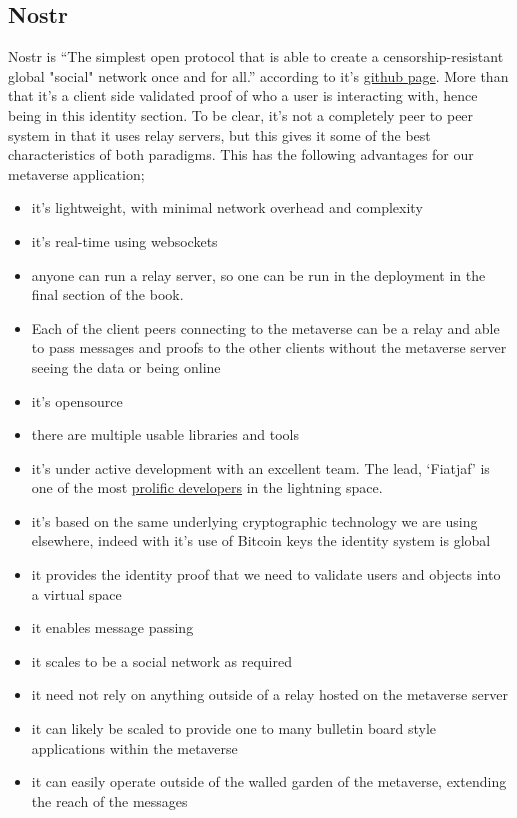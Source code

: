 \subsection{Nostr}
Nostr is ``The simplest open protocol that is able to create a censorship-resistant global "social" network once and for all.'' according to it's \href{https://github.com/fiatjaf/nostr}{github page}. More than that it's a client side validated proof of who a user is interacting with, hence being in this identity section. To be clear, it's not a completely peer to peer system in that it uses relay servers, but this gives it some of the best characteristics of both paradigms. This has the following advantages for our metaverse application; 
\begin{itemize}
\item it's lightweight, with minimal network overhead and complexity
\item it's real-time using websockets
\item anyone can run a relay server, so one can be run in the deployment in the final section of the book.
\item Each of the client peers connecting to the metaverse can be a relay and able to pass messages and proofs to the other clients without the metaverse server seeing the data or being online 
\item it's opensource
\item there are multiple usable libraries and tools
\item it's under active development with an excellent team. The lead, `Fiatjaf' is one of the most \href{https://github.com/fiatjaf}{prolific developers} in the lightning space.
\item it's based on the same underlying cryptographic technology we are using elsewhere, indeed with it's use of Bitcoin keys the identity system is global
\item it provides the identity proof that we need to validate users and objects into a virtual space
\item it enables message passing
\item it scales to be a social network as required
\item it need not rely on anything outside of a relay hosted on the metaverse server
\item it can likely be scaled to provide one to many bulletin board style applications within the metaverse
\item it can easily operate outside of the walled garden of the metaverse, extending the reach of the messages
\end{itemize} 
